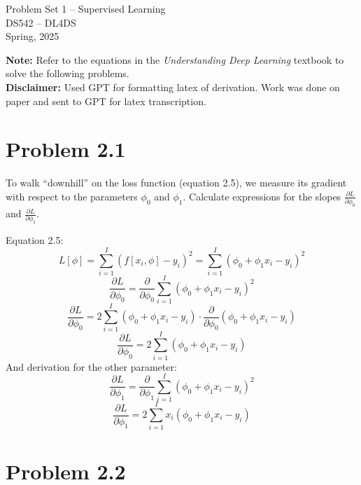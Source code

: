 \documentclass[10pt]{article}
\begin{document}
\begin{center}
    \LARGE {Problem Set 1 – Supervised Learning} \\[1em]
    \Large{DS542 – DL4DS} \\[0.5em]
    \large Spring, 2025
\end{center}

\vspace{2em}

\noindent\textbf{Note:} Refer to the equations in the \textit{Understanding Deep Learning} textbook to solve the following problems.
\\ \noindent\textbf{Disclaimer:} Used GPT for formatting latex of derivation. Work was done on paper and sent to GPT for latex transcription.

\vspace{2em}

\section*{Problem 2.1}

To walk “downhill” on the loss function (equation 2.5), we measure its gradient with respect to the parameters $\phi_0$ and $\phi_1$. Calculate expressions for the slopes $\frac{\partial L}{\partial \phi_0}$ and $\frac{\partial L}{\partial \phi_1}$.


\vspace{2em}
Equation 2.5: 
\[
L[\phi] = \sum_{i=1}^I \left(f[x_i, \phi] - y_i \right)^2 = \sum_{i=1}^I \left(\phi_0 + \phi_1 x_i - y_i \right)^2
\]
\[
\frac{\partial L}{\partial \phi_0} = \frac{\partial}{\partial \phi_0} \sum_{i=1}^I \left( \phi_0 + \phi_1 x_i - y_i \right)^2
\]
\[
\frac{\partial L}{\partial \phi_0} = 2\sum_{i=1}^I \left( \phi_0 + \phi_1 x_i - y_i \right) \cdot \frac{\partial}{\partial \phi_0} \left( \phi_0 + \phi_1 x_i - y_i \right)
\]
\[
\frac{\partial L}{\partial \phi_0} = 2 \sum_{i=1}^I \left( \phi_0 + \phi_1 x_i - y_i \right)
\]
And derivation for the other parameter:
\[
\frac{\partial L}{\partial \phi_1} = \frac{\partial}{\partial \phi_1} \sum_{i=1}^I \left( \phi_0 + \phi_1 x_i - y_i \right)^2
\]
\[
\frac{\partial L}{\partial \phi_1} = 2 \sum_{i=1}^I x_i \left( \phi_0 + \phi_1 x_i - y_i \right)
\]

\vspace{20em}

\section*{Problem 2.2}
\end{document}
